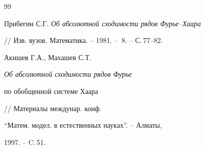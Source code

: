 \begin{thebibliography}{99}


Прибегин С.Г. {\it Об абсолютной сходимости рядов Фурье--Хаара} 


// Изв. вузов. Математика. -- 1981. -- \No\,8. -- С.\,77--82. 




Акишев Г.А., Махашев С.Т. {\it Об абсолютной сходимости рядов Фурье 


по обобщенной системе Хаара} // Материалы междунар. конф. 


``Матем. модел. в естественных науках''. -- Алматы, 


1997. -- C.\,51. 


 


\end{thebibliography} 


 


\vskip 0.5cm 


 






 


\label{end} 


 


 


